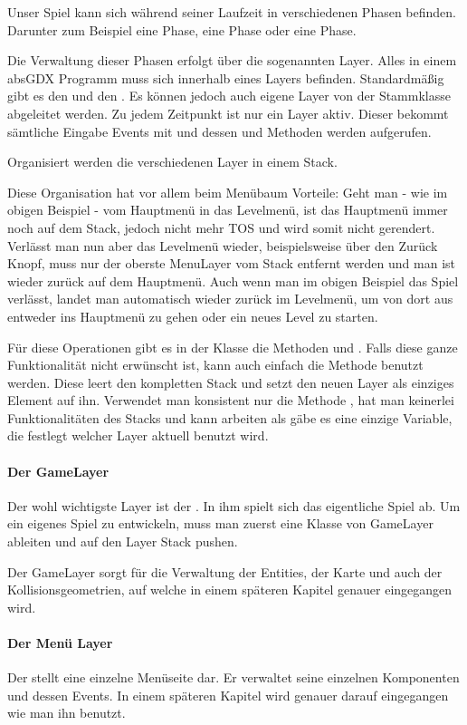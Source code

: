 Unser Spiel kann sich während seiner Laufzeit in verschiedenen Phasen befinden. Darunter zum Beispiel eine  Phase, eine  Phase oder eine  Phase.

Die Verwaltung dieser Phasen erfolgt über die sogenannten Layer. Alles in einem absGDX Programm muss sich innerhalb eines Layers befinden. Standardmäßig gibt es den  und den . Es können jedoch auch eigene Layer von der Stammklasse  abgeleitet werden. Zu jedem Zeitpunkt ist nur ein Layer aktiv. Dieser bekommt sämtliche Eingabe Events mit und dessen  und  Methoden werden aufgerufen.

Organisiert werden die verschiedenen Layer in einem Stack.


Diese Organisation hat vor allem beim Menübaum Vorteile: Geht man - wie im obigen Beispiel - vom Hauptmenü in das Levelmenü, ist das Hauptmenü immer noch auf dem Stack, jedoch nicht mehr TOS  und wird somit nicht gerendert. Verlässt man nun aber das Levelmenü wieder, beispielsweise über den Zurück Knopf, muss nur der oberste MenuLayer vom Stack entfernt werden und man ist wieder zurück auf dem Hauptmenü. Auch wenn man im obigen Beispiel das Spiel verlässt, landet man automatisch wieder zurück im Levelmenü, um von dort aus entweder ins Hauptmenü zu gehen oder ein neues Level zu starten.

Für diese Operationen gibt es in der Klasse  die Methoden  und . Falls diese ganze Funktionalität nicht erwünscht ist, kann auch einfach die Methode  benutzt werden. Diese leert den kompletten Stack und setzt den neuen Layer als einziges Element auf ihn. Verwendet man konsistent nur die Methode , hat man keinerlei Funktionalitäten des Stacks und kann arbeiten als gäbe es eine einzige Variable, die festlegt welcher Layer aktuell benutzt wird.

\paragraph{Der GameLayer}

Der wohl wichtigste Layer ist der . In ihm spielt sich das eigentliche Spiel ab. Um ein eigenes Spiel zu entwickeln, muss man zuerst eine Klasse von GameLayer ableiten und auf den Layer Stack pushen.

Der GameLayer sorgt für die Verwaltung der Entities, der Karte und auch der Kollisionsgeometrien, auf welche in einem späteren Kapitel genauer eingegangen wird.

\paragraph{Der Menü Layer}

Der  stellt eine einzelne Menüseite dar. Er verwaltet seine einzelnen Komponenten und dessen Events. In einem späteren Kapitel wird genauer darauf eingegangen wie man ihn benutzt.